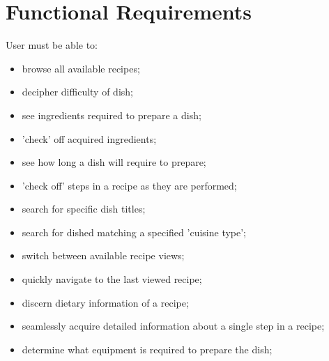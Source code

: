 \documentclass{article}
\begin{document}
\section{Functional Requirements}
User must be able to:
\begin{itemize}
\item browse all available recipes;
\item decipher difficulty of dish;
\item see ingredients required to prepare a dish;
\item 'check' off acquired ingredients;
\item see how long a dish will require to prepare;
\item 'check off' steps in a recipe as they are performed;
\item search for specific dish titles;
\item search for dished matching a specified 'cuisine type';
\item switch between available recipe views;
\item quickly navigate to the last viewed recipe;
\item discern dietary information of a recipe;
\item seamlessly acquire detailed information about a single step in a recipe;
\item determine what equipment is required to prepare the dish;
\end{itemize}

\end{document}
